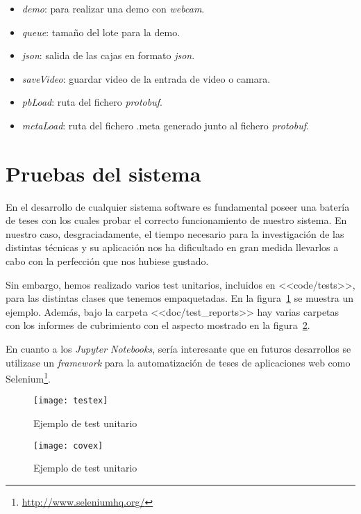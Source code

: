 \begin{itemize}
	\item \textit{demo}: para realizar una demo con \textit{webcam}.
	\item \textit{queue}: tamaño del lote para la demo.
	\item \textit{json}: salida de las cajas en formato \textit{json}.
	\item \textit{saveVideo}: guardar video de la entrada de video o camara.
	\item \textit{pbLoad}: ruta del fichero \textit{protobuf}.
	\item \textit{metaLoad}: ruta del fichero .meta generado junto al fichero \textit{protobuf}.
\end{itemize}

\section{Pruebas del sistema}

En el desarrollo de cualquier sistema software es fundamental poseer una batería de teses con los cuales probar el correcto funcionamiento de nuestro sistema. En nuestro caso, desgraciadamente, el tiempo necesario para la investigación de las distintas técnicas y su aplicación nos ha dificultado en gran medida llevarlos a cabo con la perfección que nos hubiese gustado.

Sin embargo, hemos realizado varios test unitarios, incluidos en <<code/tests>>, para las distintas clases que tenemos empaquetadas. En la figura~\ref{fig:D.1} se muestra un ejemplo. Además, bajo la carpeta <<doc/test\_reports>> hay varias carpetas con los informes de cubrimiento con el aspecto mostrado en la figura~\ref{fig:D.2}.

En cuanto a los \textit{Jupyter Notebooks}, sería interesante que en futuros desarrollos se utilizase un \textit{framework} para la automatización de teses de aplicaciones web como Selenium\footnote{\url{http://www.seleniumhq.org/}}.

\begin{figure}
\centering
\texttt{[image: testex]}
\caption{Ejemplo de test unitario}
\label{fig:D.1}
\end{figure}

\begin{figure}
\centering
\texttt{[image: covex]}
\caption{Ejemplo de test unitario}
\label{fig:D.2}
\end{figure}